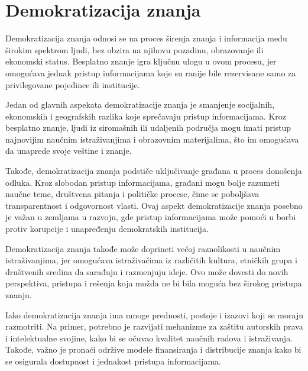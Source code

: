 \documentclass[a4paper]{article}
\begin{document}
{\setlength{\parskip}{2em}


\section{Demokratizacija znanja}
\label{Demokratizacija znanja}

Demokratizacija znanja odnosi se na proces širenja znanja i informacija među širokim spektrom ljudi, bez obzira na njihovu pozadinu, obrazovanje ili ekonomski status. Besplatno znanje igra ključnu ulogu u ovom procesu, jer omogućava jednak pristup informacijama koje su ranije bile rezervisane samo za privilegovane pojedince ili institucije.

Jedan od glavnih aspekata demokratizacije znanja je smanjenje socijalnih, ekonomskih i geografskih razlika koje sprečavaju pristup informacijama. Kroz besplatno znanje, ljudi iz siromašnih ili udaljenih područja mogu imati pristup najnovijim naučnim istraživanjima i obrazovnim materijalima, što im omogućava da unaprede svoje veštine i znanje.

Takođe, demokratizacija znanja podstiče uključivanje građana u proces donošenja odluka. Kroz slobodan pristup informacijama, građani mogu bolje razumeti naučne teme, društvena pitanja i političke procese, čime se poboljšava transparentnost i odgovornost vlasti. Ovaj aspekt demokratizacije znanja posebno je važan u zemljama u razvoju, gde pristup informacijama može pomoći u borbi protiv korupcije i unapređenju demokratskih institucija.

Demokratizacija znanja takođe može doprineti većoj raznolikosti u naučnim istraživanjima, jer omogućava istraživačima iz različitih kultura, etničkih grupa i društvenih sredina da sarađuju i razmenjuju ideje. Ovo može dovesti do novih perspektiva, pristupa i rešenja koja možda ne bi bila moguća bez širokog pristupa znanju.

Iako demokratizacija znanja ima mnoge prednosti, postoje i izazovi koji se moraju razmotriti. Na primer, potrebno je razvijati mehanizme za zaštitu autorskih prava i intelektualne svojine, kako bi se očuvao kvalitet naučnih radova i istraživanja. Takođe, važno je pronaći održive modele finansiranja i distribucije znanja kako bi se osigurala dostupnost i jednakost pristupa informacijama.

\cite{peta}


\begin{verbatim}

\end{verbatim}

}
\end{document}
